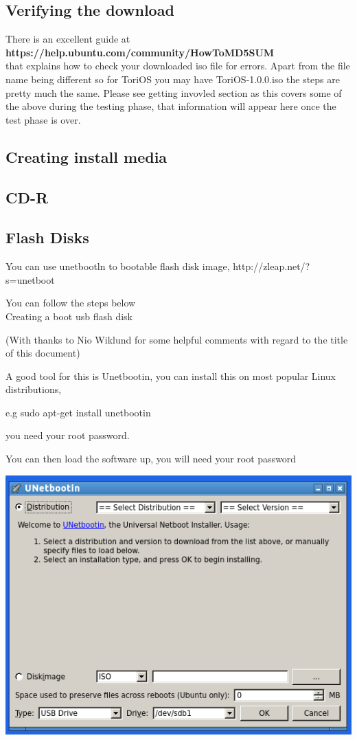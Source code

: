 \documentclass[12pt,a4paper]{book}
\begin{document}


\subsection{Verifying the download}
There is an excellent guide at\\ \textbf{https://help.ubuntu.com/community/HowToMD5SUM} \\
that explains how to check your downloaded iso file for errors.  Apart from the file name being different so for ToriOS you may have ToriOS-1.0.0.iso the steps are pretty much the same.  
Please see getting invovled section as this covers some of the above during the testing phase,  that information will appear here once the test phase is over. 
\subsection{Creating install media}

\subsection{CD-R}


\subsection{Flash Disks}

You can use unetbootln to bootable flash disk image,   http://zleap.net/?s=unetboot

You can follow the steps below \\

Creating a boot usb flash disk

(With thanks to Nio Wiklund for some helpful comments with regard to the title of this document)

A good tool for this is Unetbootin,  you can install this on most popular Linux distributions,

e.g sudo apt-get install unetbootin

you need your root password.

You can then load the software up, you will need your root password

\newpage




\begin{center}
\includegraphics[width=0.7\linewidth]{unetbootin} 
\end{center}
\end{document}
